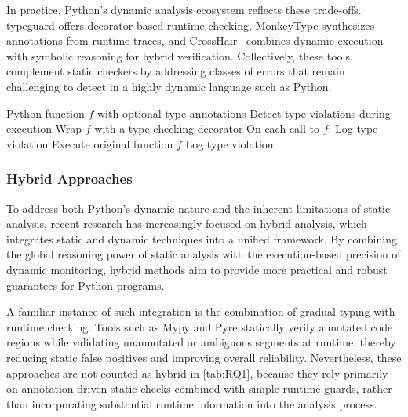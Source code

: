 In practice, Python’s dynamic analysis ecosystem reflects these trade-offs.
typeguard offers decorator-based runtime checking, MonkeyType synthesizes
annotations from runtime traces, and CrossHair~\cite{crosshair} combines
dynamic execution with symbolic reasoning for hybrid verification. 
Collectively, these tools complement static checkers by addressing classes of
errors that remain challenging to detect in a highly dynamic language such as
Python.

\begin{algorithm}[H]
\caption{RuntimeTypeMonitor}
\begin{algorithmic}[1]
\REQUIRE Python function $f$ with optional type annotations
\ENSURE Detect type violations during execution
\STATE Wrap $f$ with a type-checking decorator
\STATE On each call to $f$:
            \STATE Log type violation
        \ENDIF
    \ENDIF
\ENDFOR
\STATE Execute original function $f$
        \STATE Log type violation
    \ENDIF
\ENDIF
\end{algorithmic}
\label{alg:monitering}
\end{algorithm}


\subsubsection{\textbf{Hybrid Approaches}}
To address both Python’s dynamic nature and the inherent limitations of static
analysis, recent research has increasingly focused on hybrid analysis, which
integrates static and dynamic techniques into a unified framework.
By combining the global reasoning power of static analysis with the
execution-based precision of dynamic monitoring, hybrid methods aim to provide
more practical and robust guarantees for Python programs.

A familiar instance of such integration is the combination of gradual typing
with runtime checking.
Tools such as Mypy and Pyre statically verify annotated code regions while
validating unannotated or ambiguous segments at runtime, thereby reducing
static false positives and improving overall reliability.
Nevertheless, these approaches are not counted as hybrid in \autoref{tab:RQ1},
because they rely primarily on annotation-driven static checks combined with
simple runtime guards, rather than incorporating substantial runtime
information into the analysis process.

